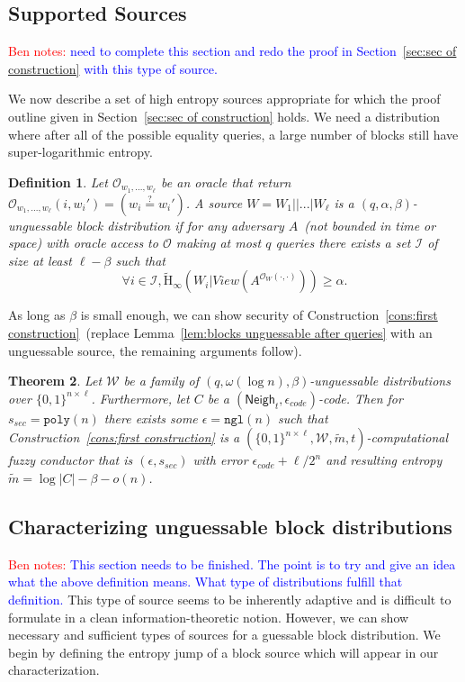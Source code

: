 \documentclass[11pt]{article}
\newcommand{\secref}[1]{\mbox{Section~\ref{#1}}}
\newcommand{\lemref}[1]{\mbox{Lemma~\ref{#1}}}
\newcommand{\consref}[1]{\mbox{Construction~\ref{#1}}}
\newcommand{\class}[1]{{\ensuremath{\mathsf{#1}}}}
\newcommand{\zo}{\ensuremath{\{0, 1\}}}
\newcommand{\neigh}{\ensuremath{\class{Neigh}}\xspace}
\newcommand{\poly}{\ensuremath{\mathtt{poly}}\xspace}
\newcommand{\ngl}{\ensuremath{\mathtt{ngl}}\xspace}
\newcommand{\Hav}{\tilde{\mathrm{H}}_\infty}
\newtheorem{theorem}{Theorem}[section]
\newtheorem{definition}[theorem]{Definition}
\newcommand{\authnote}[2]{{\textcolor{red}{\textsf{#1 notes: }\textcolor{blue}{ #2}}\marginpar{\textcolor{red}{\textbf{!!!!!}}}}}
\newcommand{\authnote}[2]{}
\newcommand{\bnote}[1]{{\authnote{Ben}{#1}}}
\begin{document}
\subsection{Supported Sources}
\label{sec:supported sources}
\bnote{need to complete this section and redo the proof in  \secref{sec:sec of construction} with this type of source.}

We now describe a set of high entropy sources appropriate for which the proof outline given in \secref{sec:sec of construction} holds.  We need a distribution where after all of the possible equality queries, a large number of blocks still have super-logarithmic entropy.

\begin{definition}
\label{def:block guessable}
Let $\mathcal{O}_{w_1,..., w_\ell}$ be an oracle that return $\mathcal{O}_{w_1,..., w_\ell}(i, w_i')=\left( w_i\overset{?}=w_i'\right)$.
A source $W = W_1||...|W_\ell$ is a $(q, \alpha, \beta)$-\emph{unguessable block distribution} if for any adversary $A$~(not bounded in time or space) with oracle access to $\mathcal{O}$ making at most $q$ queries there exists a set $\mathcal{I}$ of size at least $\ell -\beta$ such that 
\[
\forall i\in \mathcal{I}, \Hav(W_i |View(A^{\mathcal{O}_{W}(\cdot, \cdot)}))\geq \alpha.
\]
\end{definition}
As long as $\beta$ is small enough, we can show security of \consref{cons:first construction}~(replace \lemref{lem:blocks unguessable after queries} with an unguessable source, the remaining arguments follow).

\begin{theorem}
Let $\mathcal{W}$ be a family of $(q, \omega(\log n),  \beta)$-unguessable distributions over $\zo^{n\times \ell}$.  Furthermore, let $C$ be a $(\neigh_t, \epsilon_{code})$-code.  Then for $s_{sec} = \poly(n)$ there exists some $\epsilon=\ngl(n)$ such that \consref{cons:first construction} is a $(\zo^{n\times \ell}, \mathcal{W}, \tilde{m}, t)$-computational fuzzy conductor that is $(\epsilon, s_{sec})$ with error $\epsilon_{code} + \ell/2^n$ and resulting entropy $\tilde{m} = \log |C| - \beta - o(n)$.
\end{theorem}

\subsection{Characterizing unguessable block distributions}
\bnote{This section needs to be finished.  The point is to try and give an idea what the above definition means.  What type of distributions fulfill that definition.}
This type of source seems to be inherently adaptive and is difficult to formulate in a clean information-theoretic notion.  However, we can show necessary and sufficient types of sources for a guessable block distribution.  We begin by defining the entropy jump of a block source which will appear in our characterization.
\end{document}
